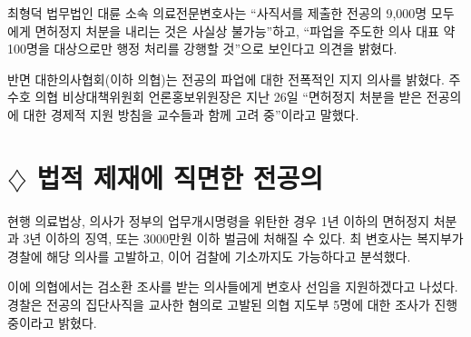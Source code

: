 \documentclass{translation}
\begin{document}
최형덕 법무법인 대륜 소속 의료전문변호사는 ``사직서를 제출한 전공의 9,000명 모두에게 면허정지 처분을 내리는 것은 사실상 불가능''하고, ``파업을 주도한 의사 대표 약 100명을 대상으로만 행정 처리를 강행할 것''으로 보인다고 의견을 밝혔다.

반면 대한의사협회(이하 의협)는 전공의 파업에 대한 전폭적인 지지 의사를 밝혔다.
주수호 의협 비상대책위원회 언론홍보위원장은 지난 26일 ``면허정지 처분을 받은 전공의에 대한 경제적 지원 방침을 교수들과 함께 고려 중''이라고 말했다.

\section*{\( \diamondsuit \) 법적 제재에 직면한 전공의} 
현행 의료법상, 의사가 정부의 업무개시명령을 위탄한 경우 1년 이하의 면허정지 처분과 3년 이하의 징역, 또는 3000만원 이하 벌금에 처해질 수 있다.
최 변호사는 복지부가 경찰에 해당 의사를 고발하고, 이어 검찰에 기소까지도 가능하다고 분석했다.

이에 의협에서는 검 소환 조사를 받는 의사들에게 변호사 선임을 지원하겠다고 나섰다.
경찰은 전공의 집단사직을 교사한 혐의로 고발된 의협 지도부 5명에 대한 조사가 진행 중이라고 밝혔다.
\end{document}
